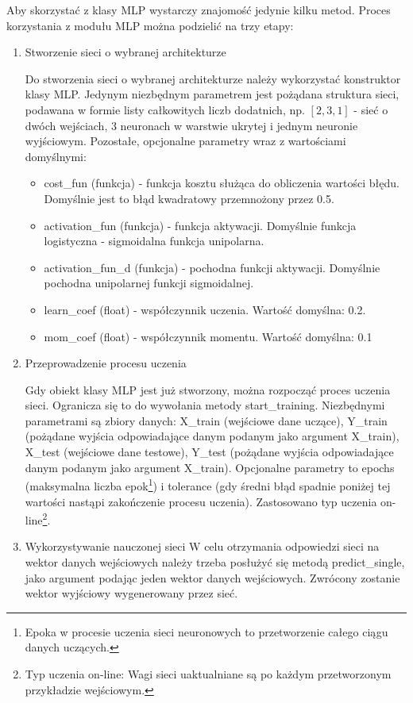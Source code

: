 Aby skorzystać z klasy MLP wystarczy znajomość jedynie kilku metod. Proces korzystania z modułu MLP można podzielić na trzy etapy:
\begin{enumerate}
\item Stworzenie sieci o wybranej architekturze

Do stworzenia sieci o wybranej architekturze należy wykorzystać konstruktor klasy MLP. Jedynym niezbędnym parametrem jest pożądana struktura sieci, podawana w formie listy całkowitych liczb dodatnich, np. $[2, 3, 1]$ - sieć o dwóch wejściach, 3 neuronach w warstwie ukrytej i jednym neuronie wyjściowym. Pozostałe, opcjonalne parametry wraz z wartościami domyślnymi:

\begin{itemize}
\item cost\_fun (funkcja) - funkcja kosztu służąca do obliczenia wartości błędu. Domyślnie jest to błąd kwadratowy przemnożony przez 0.5.
\item activation\_fun (funkcja) - funkcja aktywacji. Domyślnie funkcja logistyczna - sigmoidalna funkcja unipolarna.
\item activation\_fun\_d (funkcja) - pochodna funkcji aktywacji. Domyślnie pochodna unipolarnej funkcji sigmoidalnej.
\item learn\_coef (float) - współczynnik uczenia. Wartość domyślna: 0.2.
\item mom\_coef (float) - współczynnik momentu. Wartość domyślna: 0.1
\end{itemize}

\item Przeprowadzenie procesu uczenia

Gdy obiekt klasy MLP jest już stworzony, można rozpocząć proces uczenia sieci. Ogranicza się to do wywołania metody start\_training. Niezbędnymi parametrami są zbiory danych: X\_train (wejściowe dane uczące), Y\_train (pożądane wyjścia odpowiadające danym podanym jako argument X\_train), X\_test (wejściowe dane testowe), Y\_test (pożądane wyjścia odpowiadające danym podanym jako argument X\_train). Opcjonalne parametry to epochs (maksymalna liczba epok\footnote{Epoka w procesie uczenia sieci neuronowych to przetworzenie całego ciągu danych uczących.}) i tolerance (gdy średni błąd spadnie poniżej tej wartości nastąpi zakończenie procesu uczenia). Zastosowano typ uczenia on-line\footnote{Typ uczenia on-line: Wagi sieci uaktualniane są po każdym przetworzonym przykładzie wejściowym. }.

\item Wykorzystywanie nauczonej sieci
W celu otrzymania odpowiedzi sieci na wektor danych wejściowych należy trzeba posłużyć się metodą predict\_single, jako argument podając jeden wektor danych wejściowych. Zwrócony zostanie wektor wyjściowy wygenerowany przez sieć.
\end{enumerate}

